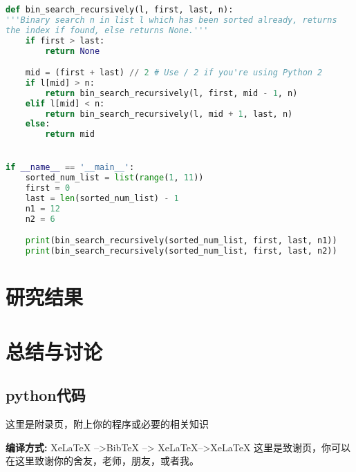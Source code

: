 \documentclass[AutoFakeBold]{LZUthesis}
\begin{document}
\begin{lstlisting}[language = python]
def bin_search_recursively(l, first, last, n):
'''Binary search n in list l which has been sorted already, returns
the index if found, else returns None.'''
	if first > last:
		return None

	mid = (first + last) // 2 # Use / 2 if you're using Python 2
	if l[mid] > n:
		return bin_search_recursively(l, first, mid - 1, n)
	elif l[mid] < n:
		return bin_search_recursively(l, mid + 1, last, n)
	else:
		return mid


if __name__ == '__main__':
	sorted_num_list = list(range(1, 11))
	first = 0
	last = len(sorted_num_list) - 1
	n1 = 12
	n2 = 6

	print(bin_search_recursively(sorted_num_list, first, last, n1))
	print(bin_search_recursively(sorted_num_list, first, last, n2))

\end{lstlisting}

\chapter{研究结果}

\chapter{总结与讨论}

\backmatter


\printbib




\Appendix
\section{python代码}
\label{sec:code}


这里是附录页，附上你的程序或必要的相关知识\cite{partl2016}

{\bfseries 编译方式:} XeLaTeX -->BibTeX --> XeLaTeX-->XeLaTeX
\Thanks
这里是致谢页，你可以在这里致谢你的舍友，老师，朋友，或者我。
\end{document}
